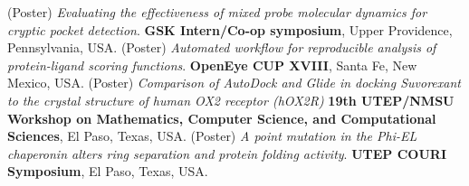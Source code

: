 %
%


\vspace{0.2cm}
\begin{scholarship}
					{(Poster) \textit{Evaluating the effectiveness of mixed probe molecular dynamics for cryptic pocket detection}.  \textbf{GSK Intern/Co-op symposium}, Upper Providence, Pennsylvania, USA.}
					{(Poster) \textit{Automated workflow for reproducible analysis of protein-ligand scoring functions}.  \textbf{OpenEye CUP XVIII},  Santa Fe, New Mexico, USA.}
					{(Poster) \textit{Comparison of AutoDock and Glide in docking Suvorexant to the crystal structure of human OX2 receptor (hOX2R)} \textbf{19th UTEP/NMSU Workshop on Mathematics, Computer Science, and Computational Sciences}, El Paso, Texas, USA.}
					{(Poster) \textit{A point mutation in the Phi-EL chaperonin alters ring separation and protein folding activity}.  \textbf{ UTEP COURI Symposium}, El Paso, Texas, USA.}
\end{scholarship}
